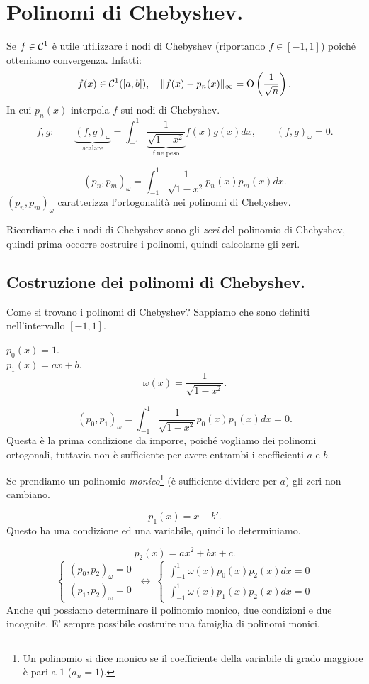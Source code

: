 \section{Polinomi di Chebyshev.}
Se $f\in \mathcal{C}^1$ è utile utilizzare i nodi di Chebyshev (riportando $f \in
[-1,1]$) poiché otteniamo convergenza. Infatti:
\[
f(x) \in \mathcal{C}^1([a,b]), \quad \|f(x) - p_n(x)\|_\infty =
\textrm{O}\left(\frac{1}{\sqrt{n}}\right).
\]
In cui $p_n(x)$ interpola $f$ sui nodi di Chebyshev.
\[
f, g: \qquad \underbrace{(f, g)_\omega}_{\textrm{scalare}}
= \int_{-1}^1 \underbrace{\frac{1}{\sqrt{1-x^2}}}_{\textrm{f.ne peso}}f(x)g(x)dx,
\qquad (f, g)_\omega = 0.
\]

\[
(p_n, p_m)_\omega = \int_{-1}^1\frac{1}{\sqrt{1-x^2}}p_n(x)p_m(x)dx.
\]
$(p_n, p_m)_\omega$ caratterizza l'ortogonalità nei polinomi di Chebyshev.

Ricordiamo che i nodi di Chebyshev sono gli \emph{zeri} del polinomio di
Chebyshev, quindi prima occorre costruire i polinomi, quindi calcolarne gli
zeri.

\subsection{Costruzione dei polinomi di Chebyshev.}
Come si trovano i polinomi di Chebyshev? Sappiamo che sono definiti
nell'intervallo $[-1,1]$.
\begin{flushleft}
$p_0(x) = 1$.\\
$p_1(x) = ax +b$.\\
\[
\omega(x) = \frac{1}{\sqrt{1-x^2}}.
\]

\[
(p_0, p_1)_\omega = \int_{-1}^1\frac{1}{\sqrt{1-x^2}}p_0(x)p_1(x)dx = 0.
\]
Questa è la prima condizione da imporre, poiché vogliamo dei polinomi
ortogonali, tuttavia non è sufficiente per avere entrambi i coefficienti $a$
e $b$.
\end{flushleft}

Se prendiamo un polinomio \emph{monico}\footnote{Un polinomio si dice monico
se il coefficiente della variabile di grado maggiore è pari a $1$ ($a_n=1$).}
 (è sufficiente dividere per $a$) gli zeri non cambiano.

\[p_1(x) = x + b'.\]
Questo ha una condizione ed una variabile, quindi lo determiniamo.

\[
p_2(x) = ax^2+bx+c.
\]
\[
\left\{
\begin{array}{l}(p_0,p_2)_\omega=0 \\(p_1,p_2)_\omega=0 \end{array}
\right. \ \longleftrightarrow \
\left\{
\begin{array}{l}\int_{-1}^1\omega(x)p_0(x)p_2(x)dx = 0\\
\int_{-1}^1\omega(x)p_1(x)p_2(x)dx = 0\end{array}
\right.
\]
Anche qui possiamo determinare il polinomio monico, due condizioni e due
incognite. E' sempre possibile costruire una famiglia di polinomi monici.

